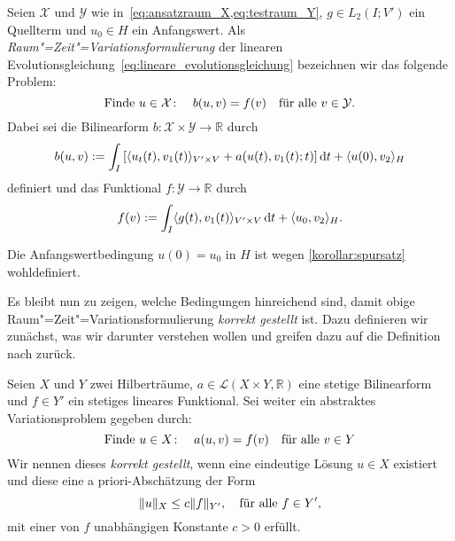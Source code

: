\documentclass[../main.tex]{subfiles}
\begin{document}
\begin{Definition}
\label{definition:absktrakte_raum_zeit_formulierung}
    Seien $\mathcal X$ und $\mathcal Y$ wie in~\cref{eq:ansatzraum_X,eq:testraum_Y}, $g \in L_{2}(I; V')$ ein Quellterm und $u_{0} \in H$ ein Anfangswert.
    Als \emph{Raum"=Zeit"=Variationsformulierung} der linearen Evolutionsgleichung~\cref{eq:lineare_evolutionsgleichung} bezeichnen wir das folgende Problem:
    \begin{equation}
        \label{eq:absktrakte_raum_zeit_formulierung}
        \text{Finde } u \in \mathcal X \colon \quad b(u, v) = f(v) \quad \fa v \in \mathcal Y.
    \end{equation}
    Dabei sei die Bilinearform $b \colon \mathcal X \times \mathcal Y \to \mathbb{R}$ durch
    \begin{equation}
        \label{eq:absktrakte_raum_zeit_formulierung:lhs}
        b(u, v) := \int_{I} \left[   \skp{u_{t}(t)}{v_{1}(t)}{V' \times V} + a(u(t), v_{1}(t); t)  \right] \diff t + \skp{u(0)}{v_{2}}{H}
    \end{equation}
    definiert und das Funktional $f \colon \mathcal Y \to \mathbb{R}$ durch
    \begin{equation}
        \label{eq:absktrakte_raum_zeit_formulierung:rhs}
        f(v) := \int_{I} \skp{g(t)}{v_{1}(t)}{V' \times V} \diff t + \skp{u_{0}}{v_{2}}{H}.
    \end{equation}
\end{Definition}

\begin{Bemerkung}
    Die Anfangswertbedingung $u(0) = u_{0}$ in $H$ ist wegen \cref{korollar:spursatz} wohldefiniert.
\end{Bemerkung}

Es bleibt nun zu zeigen, welche Bedingungen hinreichend sind, damit obige Raum"=Zeit"=Variationsformulierung \emph{korrekt gestellt} ist.
Dazu definieren wir zunächst, was wir darunter verstehen wollen und greifen dazu auf die Definition nach \textcite{hadamard1902problemes} zurück.

\begin{Definition}[Hadamard]
\label{definition:sachgemaess_gestellt_nach_hadamard}
    Seien $X$ und $Y$ zwei Hilberträume, $a \in \mathcal L(X \times Y, \mathbb{R})$ eine stetige Bilinearform und $f \in Y'$ ein stetiges lineares Funktional.
    Sei weiter ein abstraktes Variationsproblem gegeben durch:
    \begin{equation}
    \label{eq:hadamard_variationsproblem}
        \text{Finde } u \in X \colon \quad a(u, v) = f(v) \quad \fa v \in Y
    \end{equation}
    Wir nennen dieses \emph{korrekt gestellt}, wenn eine eindeutige Lösung $u \in X$ existiert und diese eine a priori-Abschätzung der Form
    \begin{equation}
    \label{eq:hadamard_abschaetzung}
        \norm{u}_{X} \leq c \norm{f}_{Y'}, \quad \fa f \in Y',
    \end{equation}
    mit einer von $f$ unabhängigen Konstante $c > 0$ erfüllt.
\end{Definition}
\end{document}
